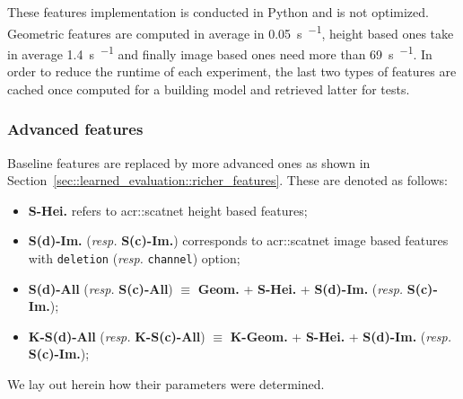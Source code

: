             These features implementation is conducted in Python and is not optimized.
            Geometric features are computed in average in \SI{0.05}{\s \per \building}, height based ones take in average \SI{1.4}{\s \per \building} and finally image based ones need more than \SI{69}{\s \per \building}.
            In order to reduce the runtime of each experiment, the last two types of features are cached once computed for a building model and retrieved latter for tests.

        \subsubsection{Advanced features}
            Baseline features are replaced by more advanced ones as shown in Section~\ref{sec::learned_evaluation::richer_features}.
            These are denoted as follows:
            \begin{itemize}[label=\(\blacktriangleright\)]
                \item \textbf{S-Hei.} refers to \gls{acr::scatnet} height based features;
                \item \textbf{S(d)-Im.} (\textit{resp.} \textbf{S(c)-Im.}) corresponds to \gls{acr::scatnet} image based features with \texttt{deletion} (\textit{resp.} \texttt{channel}) option;
                \item \textbf{S(d)-All} (\textit{resp.} \textbf{S(c)-All}) \(\equiv\) \textbf{Geom.} + \textbf{S-Hei.} + \textbf{S(d)-Im.} (\textit{resp.} \textbf{S(c)-Im.});
                \item \textbf{K-S(d)-All} (\textit{resp.} \textbf{K-S(c)-All}) \(\equiv\) \textbf{K-Geom.} + \textbf{S-Hei.} + \textbf{S(d)-Im.} (\textit{resp.} \textbf{S(c)-Im.});
            \end{itemize}
            We lay out herein how their parameters were determined.

